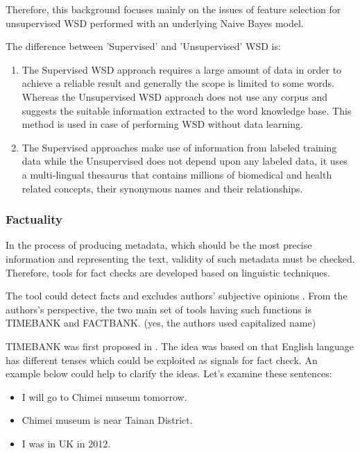 Therefore, this background focuses mainly on the issues of feature selection for unsupervised WSD performed with an underlying Naive Bayes model.

The difference between 'Supervised' and 'Unsupervised' WSD is:

\begin{enumerate}
	\item The Supervised WSD approach requires a large amount of data in order to achieve a reliable result and generally the scope is limited to some words. 
	Whereas the Unsupervised WSD approach does not use any corpus and suggests the suitable information extracted to the word knowledge base.
	This method is used in case of performing WSD without data learning.
	\item The Supervised approaches make use of information from labeled training data while the Unsupervised does not depend upon any labeled data, it uses a multi-lingual thesaurus that contains millions of biomedical and health related concepts, their synonymous names and their relationships.
\end{enumerate}


\subsubsection*{Factuality}

In the process of producing metadata, which should be the most precise information and representing the text, validity of such metadata must be checked. Therefore, tools for fact checks are developed based on linguistic techniques. 

The tool could detect facts and excludes authors' subjective opinions \cite{Agerri2014}. From the authors's perspective, the two main set of tools having such functions is TIMEBANK and FACTBANK. (yes, the authors used capitalized name)

TIMEBANK was first proposed in \cite{pustejovsky2003timebank}. 
The idea was based on that English language has different tenses which could be exploited as signals for fact check. 
An example below could help to clarify the ideas. Let's examine these sentences:

\begin{itemize}
	\item I will go to Chimei museum tomorrow.
	\item Chimei museum is near Tainan District.
	\item I was in UK in 2012.
\end{itemize}


